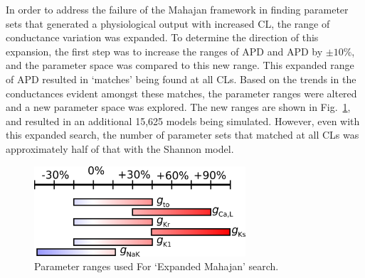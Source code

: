 \documentclass[../thesis-main.tex]{subfiles}
\begin{document}
In order to address the failure of the Mahajan framework in finding parameter sets that generated a physiological output with increased CL, the range of conductance variation was expanded. To determine the direction of this expansion, the first step was to increase the ranges of APD and APD by $\pm10\%$, and the parameter space was compared to this new range. This expanded range of APD resulted in `matches' being found at all CLs. Based on the trends in the conductances evident amongst these matches, the parameter ranges were altered and a new parameter space was explored. The new ranges are shown in Fig.~\ref{fig:expandedMahajan}, and resulted in an additional 15,625 models being simulated. However, even with this expanded search, the number of parameter sets that matched at all CLs was approximately half of that with the Shannon model.
\begin{figure}
 \centering
 \includegraphics[width=0.7\textwidth]{expandedMahajan}
 \caption[Parameter ranges used For `Expanded Mahajan' search.]{Parameter ranges used For `Expanded Mahajan' search.}
 \label{fig:expandedMahajan}
\end{figure}
\end{document}
